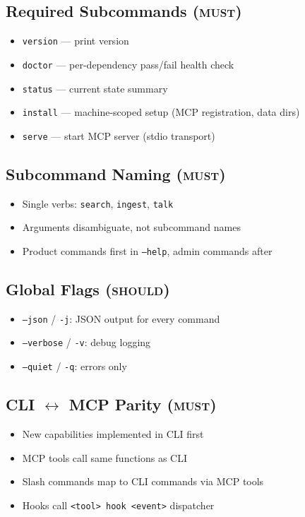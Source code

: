 \documentclass[a4paper,10pt]{article}
\newcommand{\must}{\textsc{must}}
\newcommand{\should}{\textsc{should}}
\begin{document}
\subsection{Required Subcommands (\must)}
\begin{itemize}
  \item \texttt{version} --- print version
  \item \texttt{doctor} --- per-dependency pass/fail health check
  \item \texttt{status} --- current state summary
  \item \texttt{install} --- machine-scoped setup (MCP registration, data dirs)
  \item \texttt{serve} --- start MCP server (stdio transport)
\end{itemize}

\subsection{Subcommand Naming (\must)}
\begin{itemize}
  \item Single verbs: \texttt{search}, \texttt{ingest}, \texttt{talk}
  \item Arguments disambiguate, not subcommand names
  \item Product commands first in \texttt{--help}, admin commands after
\end{itemize}

\subsection{Global Flags (\should)}
\begin{itemize}
  \item \texttt{--json} / \texttt{-j}: JSON output for every command
  \item \texttt{--verbose} / \texttt{-v}: debug logging
  \item \texttt{--quiet} / \texttt{-q}: errors only
\end{itemize}

\subsection{CLI $\leftrightarrow$ MCP Parity (\must)}
\begin{itemize}
  \item New capabilities implemented in CLI first
  \item MCP tools call same functions as CLI
  \item Slash commands map to CLI commands via MCP tools
  \item Hooks call \texttt{<tool> hook <event>} dispatcher
\end{itemize}
\end{document}
